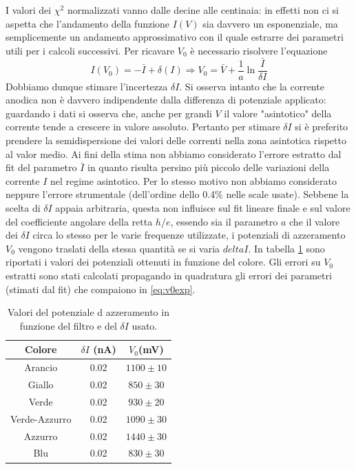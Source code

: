 \documentclass[10pt,a4paper]{article}
\begin{document}
I valori dei $\chi^2$ normalizzati vanno dalle decine alle centinaia: in effetti non ci si aspetta che l'andamento della funzione $I(V)$ sia davvero un esponenziale, ma semplicemente un andamento approssimativo con il quale estrarre dei parametri utili per i calcoli successivi.
Per ricavare $V_0$ è necessario risolvere l'equazione
\begin{equation}\label{eq:v0exp}
I(V_0)=-\bar{I}+\delta(I)\Rightarrow V_0=\bar{V}+\frac{1}{a}\ln\frac{\bar{I}}{\delta I}
\end{equation} 
Dobbiamo dunque stimare l'incertezza $\delta I$. 
Si osserva intanto che la corrente anodica non è davvero indipendente dalla differenza di potenziale applicato: guardando i dati si osserva che, anche per grandi $V$ il valore "asintotico" della corrente tende a crescere in valore assoluto.
Pertanto per stimare $\delta I$ si è preferito prendere la semidispersione dei valori delle correnti nella zona asintotica rispetto al valor medio.
Ai fini della stima non abbiamo considerato l'errore estratto dal fit del parametro $\bar{I}$ in quanto risulta persino più piccolo delle variazioni della corrente $I$ nel regime asintotico.
Per lo stesso motivo non abbiamo considerato neppure l'errore strumentale (dell'ordine dello 0.4\% nelle scale usate).
Sebbene la scelta di $\delta I$ appaia arbitraria, questa non influisce sul fit lineare finale e sul valore del coefficiente angolare della retta $h/e$, essendo sia il parametro $a$ che il valore dei $\delta I$ circa lo stesso per le varie frequenze utilizzate, i potenziali di azzeramento $V_0$ vengono traslati della stessa quantità se si varia $delta I$.
In tabella \ref{tab:V_0} sono riportati i valori dei potenziali ottenuti in funzione del colore. Gli errori su $V_0$ estratti sono stati calcolati propagando in quadratura gli errori dei parametri (stimati dal fit) che compaiono in \ref{eq:v0exp}.
\begin{table}[!htb]
\centering
\begin{tabular}{|c|c|c|}
\hline
Colore & $\delta I$ (nA) & $V_{0}$(mV)\\
\hline
Arancio & 0.02 & $1100\pm 10$\\
\hline
Giallo & 0.02 & $850 \pm 30$\\
\hline
Verde & 0.02 & $930 \pm 20$\\
\hline
Verde-Azzurro & 0.02 & $1090\pm 30$ \\
\hline
Azzurro & 0.02 & $1440 \pm 30$\\
\hline
Blu & 0.02 & $830 \pm 30$\\
\hline
\end{tabular}
\caption{Valori del potenziale d azzeramento in funzione del filtro e del $\delta I$ usato.\label{tab:V_0}}
\end{table}
\end{document}
